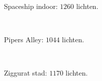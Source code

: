 \begin{figure}[p]
  \begin{minipage}[t]{0.5\textwidth}
    \begin{subfigure}[b]{0.75\textwidth}
      \begin{adjustbox}{minipage=\textwidth, scale=0.4}
        \def\svgwidth{2.8\textwidth}
        
      \end{adjustbox}
      \begin{center}
        \caption{Spaceship indoor: $1260$ lichten.}
      \end{center}
      \label{fig:hs-seed-construction-time::si-high}
    \end{subfigure}\\
    \begin{subfigure}[b]{0.75\textwidth}
      \begin{adjustbox}{minipage=\textwidth, scale=0.4}
        \def\svgwidth{2.8\textwidth}
        
      \end{adjustbox}
      \begin{center}
        \caption{Pipers Alley: $1044$ lichten.}
      \end{center}
      \label{fig:hs-seed-construction-time::pa-high}
    \end{subfigure}\\
    \begin{subfigure}[b]{0.75\textwidth}
      \begin{adjustbox}{minipage=\textwidth, scale=0.4}
        \def\svgwidth{2.8\textwidth}
        
      \end{adjustbox}
      \begin{center}
        \caption{Ziggurat stad: $1170$ lichten.}
      \end{center}
      \label{fig:hs-seed-construction-time::zc-high}
    \end{subfigure}\\
    \caption{Overzicht van de constructietijd van de verbindingloze octree
             bij verschillende seeds.}
    \label{fig:hs-seed-construction-time}
  \end{minipage} %
  \begin{minipage}[t]{0.5\textwidth}
    \begin{subfigure}[b]{0.75\textwidth}
      \begin{adjustbox}{minipage=\textwidth, scale=0.4}

\end{adjustbox}
\end{subfigure}
\end{minipage}
\end{figure}
